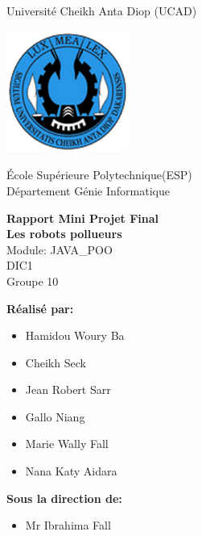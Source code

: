 \documentclass[12pt , a4paper]{report}
\begin{document}
	\begin{center}
		\normalsize{Université Cheikh Anta Diop (UCAD)}\\
		\begin{center}
			\includegraphics[width=4cm,height=4cm]{Logo_ucad_2.png}
		\end{center}
		\normalsize{École Supérieure Polytechnique(ESP)}\\
		\normalsize{Département Génie Informatique}\\
	\end{center}
	
	\begin{center}
		\Huge{\textbf{Rapport Mini Projet Final}}\\
		\vspace{0.7cm}
		\LARGE{\textbf{Les robots pollueurs}}\\
		\vspace{0.7cm}
		\large{Module: JAVA\_POO}\\
		\vspace{0.2cm}
		\large{DIC1}\\
		\vspace{0.2cm}
		\large{Groupe 10}\\
	\end{center}

	\begin{multicols}{2}
		\textbf{Réalisé par:}
		\begin{itemize}
			\item Hamidou Woury Ba
			\item Cheikh Seck
			\item Jean Robert Sarr
			\item Gallo Niang
			\item Marie Wally Fall
			\item Nana Katy Aidara
		\end{itemize}
		\columnbreak
		\textbf{Sous la direction de:}
		\begin{itemize}
			\item Mr Ibrahima Fall
		\end{itemize}
	\end{multicols}
	\begin{center}
	\end{center}
	
\end{document}
